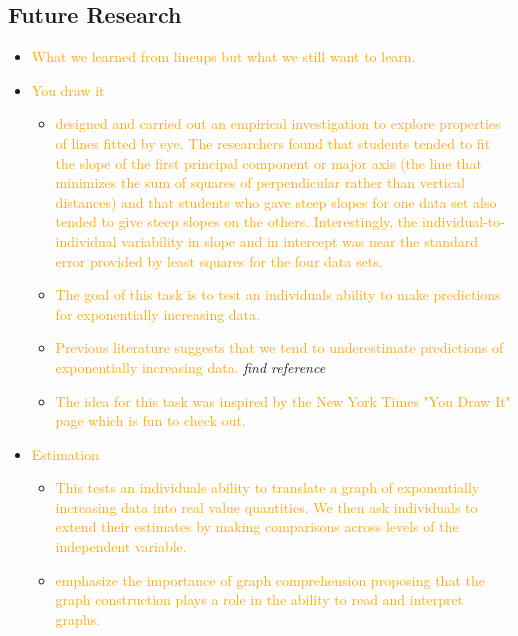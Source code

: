\documentclass[]{interact}
\theoremstyle{plain}%
\theoremstyle{definition}
\theoremstyle{remark}
\begin{document}
\hypertarget{future-research}{%
\subsection{Future Research}\label{future-research}}

\begin{itemize}
\item
  \textcolor{Orange}{What we learned from lineups but what we still want to learn.}
\item
  \textcolor{Orange}{You draw it}

  \begin{itemize}
  \item
    \citet{mosteller_eye_1981}
    \textcolor{Orange}{designed and carried out an empirical investigation to explore properties of lines fitted by eye. The researchers found that students tended to fit the slope of the first principal component or major axis (the line that minimizes the sum of squares of perpendicular rather than vertical distances) and that students who gave steep slopes for one data set also tended to give steep slopes on the others. Interestingly, the individual-to-individual variability in slope and in intercept was near the standard error provided by least squares for the four data sets.}
  \item
    \textcolor{Orange}{The goal of this task is to test an individuals ability to make predictions for exponentially increasing data.}
  \item
    \textcolor{Orange}{Previous literature suggests that we tend to underestimate predictions of exponentially increasing data.}
    \emph{find reference}
  \item
    \textcolor{Orange}{The idea for this task was inspired by the New York Times "You Draw It" page which is fun to check out.}
  \end{itemize}
\item
  \textcolor{Orange}{Estimation}

  \begin{itemize}
  \item
    \textcolor{Orange}{This tests an individuals ability to translate a graph of exponentially increasing data into real value quantities. We then ask individuals to extend their estimates by making comparisons across levels of the independent variable.}
  \item
    \citet{friel_making_2001}
    \textcolor{Orange}{emphasize the importance of graph comprehension proposing that the graph construction plays a role in the ability to read and interpret graphs.}
  \end{itemize}
\end{itemize}
\end{document}
